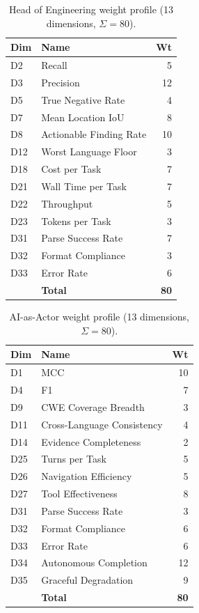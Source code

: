 \documentclass[10pt,twocolumn]{article}
\begin{document}
\begin{table}[t]
\centering
\caption{Head of Engineering weight profile (13 dimensions, $\Sigma = 80$).}
\label{tab:engineer_profile}
\small
\begin{tabular}{@{}l l r@{}}
\toprule
\textbf{Dim} & \textbf{Name} & \textbf{Wt} \\
\midrule
D2  & Recall                     & 5 \\
D3  & Precision                  & 12 \\
D5  & True Negative Rate         & 4 \\
D7  & Mean Location IoU          & 8 \\
D8  & Actionable Finding Rate    & 10 \\
D12 & Worst Language Floor       & 3 \\
D18 & Cost per Task              & 7 \\
D21 & Wall Time per Task         & 7 \\
D22 & Throughput                 & 5 \\
D23 & Tokens per Task            & 3 \\
D31 & Parse Success Rate         & 7 \\
D32 & Format Compliance          & 3 \\
D33 & Error Rate                 & 6 \\
\midrule
    & \textbf{Total}             & \textbf{80} \\
\bottomrule
\end{tabular}
\end{table}

\begin{table}[t]
\centering
\caption{AI-as-Actor weight profile (13 dimensions, $\Sigma = 80$).}
\label{tab:ai_actor_profile}
\small
\begin{tabular}{@{}l l r@{}}
\toprule
\textbf{Dim} & \textbf{Name} & \textbf{Wt} \\
\midrule
D1  & MCC                        & 10 \\
D4  & F1                         & 7 \\
D9  & CWE Coverage Breadth       & 3 \\
D11 & Cross-Language Consistency  & 4 \\
D14 & Evidence Completeness      & 2 \\
D25 & Turns per Task             & 5 \\
D26 & Navigation Efficiency      & 5 \\
D27 & Tool Effectiveness         & 8 \\
D31 & Parse Success Rate         & 3 \\
D32 & Format Compliance          & 6 \\
D33 & Error Rate                 & 6 \\
D34 & Autonomous Completion      & 12 \\
D35 & Graceful Degradation       & 9 \\
\midrule
    & \textbf{Total}             & \textbf{80} \\
\bottomrule
\end{tabular}
\end{table}
\end{document}
